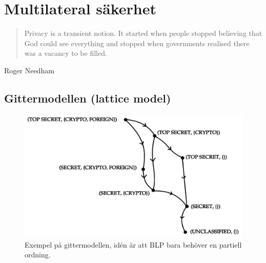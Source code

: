 \mode*




\section{Multilateral säkerhet}
\begin{frame}{\insertsubsectionhead}
  \begin{quote}
    Privacy is a transient notion.
    It started when people stopped believing that God could see everything and 
    stopped when governments realised there was a vacancy to be filled.
  \end{quote}
  \begin{flushright}
    Roger Needham
  \end{flushright}
\end{frame}

\subsection{Gittermodellen (lattice model)}
\begin{frame}{\insertsubsectionhead}
  \begin{figure}
    \includegraphics[height=0.7\textheight]{lattice.png}
    \caption{Exempel på gittermodellen, idén är att BLP bara behöver en 
    partiell ordning.}
  \end{figure}
\end{frame}

